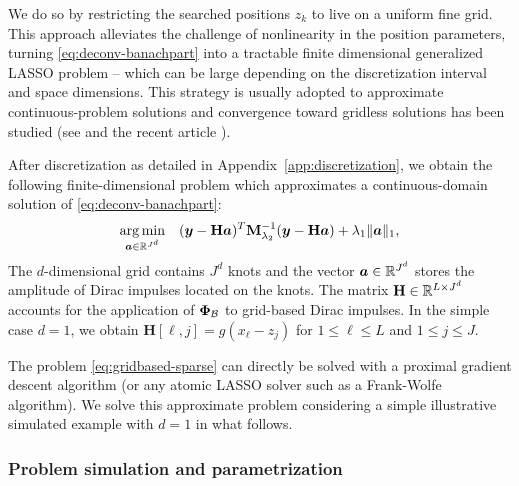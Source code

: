 \documentclass[12pt]{article}
\begin{document}

    
        We do so by restricting the searched positions $z_k$ to live on a uniform fine grid. This approach alleviates the challenge of nonlinearity in the position parameters, turning \eqref{eq:deconv-banachpart} into a tractable finite dimensional generalized LASSO problem -- which can be large depending on the discretization interval and space dimensions. This strategy is usually adopted to approximate continuous-problem solutions \cite{simeoni2020functional,Debarre2019} and convergence toward gridless solutions has been studied (see \cite{duval2017sparseI,debarre2022part2} and the recent article \cite{guillemet2025a}). 

        After discretization as detailed in Appendix~\ref{app:discretization}, we obtain the following finite-dimensional problem which approximates a continuous-domain solution of \eqref{eq:deconv-banachpart}:
        \begin{equation}
            \label{eq:gridbased-sparse}
            \underset{ \bm{a} \in \mathbb{R}^{J^d}}{\arg\min} \quad ( \bm{y} - \mathbf{H}\bm{a}  )^T \mathbf{M}_{\lambda_{2}}^{-1} ( \bm{y} - \mathbf{H}\bm{a}  )  + \lambda_{1} \| \bm{a} \|_{1},
        \end{equation}
        The $d$-dimensional grid contains $J^d$ knots and the vector $\bm{a}\in\mathbb{R}^{J^d}$ stores the amplitude of Dirac impulses located on the knots.
        The matrix $\mathbf{H} \in \mathbb{R}^{L \times J^d}$ accounts for the application of $\bm{\Phi}_\mathcal{B}$ to grid-based Dirac impulses.
        In the simple case $d=1$, we obtain $\mathbf{H}[\ell, j] = g(x_{\ell} - z_j)$ for $1 \leq \ell \leq L $ and $1 \leq j \leq J$.
        
        The problem \eqref{eq:gridbased-sparse} can directly be solved with a proximal gradient descent algorithm (or any atomic LASSO solver such as a Frank-Wolfe algorithm). We solve this approximate problem considering a simple illustrative simulated example with $d=1$ in what follows.

        \subsubsection{Problem simulation and parametrization}
\end{document}
